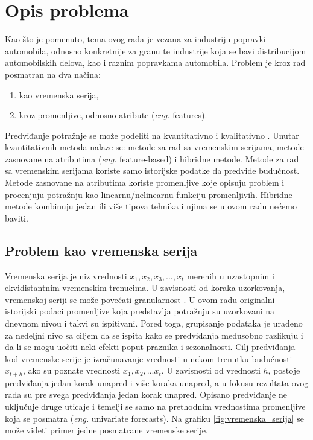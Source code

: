 \documentclass[12pt,oneside]{memoir}
\begin{document}
\section{Opis problema}
\label{section:opis_problema}
Kao što je pomenuto, tema ovog rada je vezana za industriju popravki automobila, odnosno konkretnije za granu te industrije koja se bavi distribucijom automobilskih delova, kao i raznim popravkama automobila. Problem je kroz rad posmatran na dva načina: 
\begin{enumerate}
    \item kao vremenska serija,
    \item kroz promenljive, odnosno atribute (\textit{eng.} features).
\end{enumerate}
Predviđanje potražnje se može podeliti na kvantitativno i kvalitativno \cite{choi2020forecasting}. Unutar kvantitativnih metoda nalaze se: metode za rad sa vremenskim serijama, metode zasnovane na atributima (\textit{eng.} feature-based) i hibridne metode. Metode za rad sa vremenskim serijama koriste samo istorijske podatke da predvide budućnost. Metode zasnovane na atributima koriste promenljive koje opisuju problem i procenjuju potražnju kao linearnu/nelinearnu funkciju promenljivih. Hibridne metode kombinuju jedan ili više tipova tehnika i njima se u ovom radu nećemo baviti.

\subsection{Problem kao vremenska serija}
Vremenska serija je niz vrednosti $x_1, x_2, x_3, ..., x_t$ merenih u uzastopnim i ekvidistantnim vremenskim trenucima. U zavisnosti od koraka uzorkovanja, vremenskoj seriji se može povećati granularnost \cite{henkelmann2018deep}. U ovom radu originalni istorijski podaci promenljive koja predstavlja potražnju su uzorkovani na dnevnom nivou i takvi su ispitivani. Pored toga, grupisanje podataka je urađeno za nedeljni nivo sa ciljem da se ispita kako se predviđanja međusobno razlikuju i da li se mogu uočiti neki efekti poput praznika i sezonalnosti.
Cilj predviđanja kod vremenske serije je izračunavanje vrednosti u nekom trenutku budućnosti $x_{t+h}$, ako su poznate vrednosti $x_{1}, x_{2},...x_{t}$. U zavisnosti od vrednosti $h$, postoje predviđanja jedan korak unapred i više koraka unapred, a u fokusu rezultata ovog rada su pre svega predviđanja jedan korak unapred. Opisano predviđanje ne uključuje druge uticaje i temelji se samo na prethodnim vrednostima promenljive koja se posmatra (\textit{eng.} univariate forecasts). Na grafiku \ref{fig:vremenska_serija} se može videti primer jedne posmatrane vremenske serije.
\end{document}
